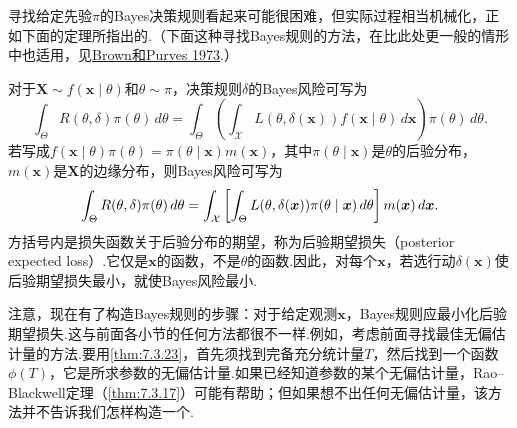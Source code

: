 寻找给定先验$\pi$的Bayes决策规则看起来可能很困难，但实际过程相当机械化，正如下面的定理所指出的.（下面这种寻找Bayes规则的方法，在比此处更一般的情形中也适用，见\hyperref[bib:source54]{Brown和Purves 1973}.）

对于$\boldsymbol X\sim f(\boldsymbol x\mid\theta)$和$\theta\sim\pi$，决策规则$\delta$的Bayes风险可写为
$$\int_\Theta R(\theta,\delta)\pi(\theta)\,d\theta=\int_\Theta\left(\int_{\mathcal X}L(\theta,\delta(\boldsymbol x))f(\boldsymbol x\mid\theta)\,d\boldsymbol x\right)\pi(\theta)\,d\theta.$$
若写成$f(\boldsymbol x\mid\theta)\pi(\theta)=\pi(\theta\mid\boldsymbol x)m(\boldsymbol x)$，其中$\pi(\theta\mid\boldsymbol x)$是$\theta$的后验分布，$m(\boldsymbol x)$是$\boldsymbol X$的边缘分布，则Bayes风险可写为
\begin{equation}\label{eq:7.3.19}\index{SI0660@后验期望损失}\index{SI0820@后验期望损失（另见损失函数）}
\int_\Theta R(\theta,\delta)\pi(\theta)\,d\theta=\int_{\mathcal X}\left[\int_\Theta L(\theta,\delta(\boldsymbol x))\pi(\theta\mid\boldsymbol x)\,d\theta\right]m(\boldsymbol x)\,d\boldsymbol x.
\end{equation}
方括号内是损失函数关于后验分布的期望，称为后验期望损失（posterior expected \mbox{loss）.}它仅是$\boldsymbol x$的函数，不是$\theta$的函数.因此，对每个$\boldsymbol x$，若选行动$\delta(\boldsymbol x)$使后验期望损失最小，就使Bayes风险最小.

注意，现在有了构造Bayes规则的步骤：对于给定观测$\boldsymbol x$，Bayes规则应最小化后验期望损失.这与前面各小节的任何方法都很不一样.例如，考虑前面寻找最佳无偏估计量的方法.要用\autoref{thm:7.3.23}，首先须找到完备充分统计量$T$，然后找到一个函数$\phi(T)$，它是所求参数的无偏估计量.如果已经知道参数的某个无偏估计量，Rao--Blackwell定理（\autoref{thm:7.3.17}）可能有帮助；但如果想不出任何无偏估计量，该方法并不告诉我们怎样构造一个.

